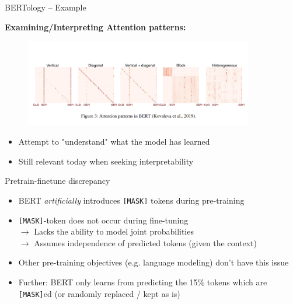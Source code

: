 \begin{frame}{BERTology -- Example}

\vfill

\textbf{Examining/Interpreting Attention patterns:}

\begin{figure}%
\includegraphics[width=10cm]{figure/att-pattern-bert.png}%
\end{figure}

\begin{itemize}
	\item Attempt to "understand" what the model has learned
	\item Still relevant today when seeking interpretability
\end{itemize}

\vfill

\end{frame}


\begin{frame}{Pretrain-finetune discrepancy}

\vfill

	\begin{itemize}
		\item BERT \textit{artificially} introduces \texttt{[MASK]} tokens during pre-training
		\item \texttt{[MASK]}-token does not occur during fine-tuning\\
					$\rightarrow$ Lacks the ability to model joint probabilities\\
					$\rightarrow$ Assumes independence of predicted tokens (given the context)
		\item Other pre-training objectives (e.g. language modeling) don't have this issue
		\item Further: BERT only learns from predicting the 15\% tokens which are \texttt{[MASK]}ed (or randomly replaced / kept as is)
	\end{itemize}

\vfill

\end{frame}

